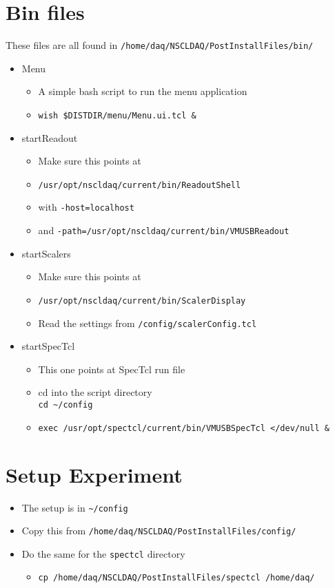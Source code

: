 \documentclass[11pt]{article}
\begin{document}
\section*{Bin files}
\label{sec-8}
These files are all found in \verb~/home/daq/NSCLDAQ/PostInstallFiles/bin/~
\begin{itemize}
\item Menu
\begin{itemize}
\item A simple bash script to run the menu application
\item \verb~wish $DISTDIR/menu/Menu.ui.tcl &~
\end{itemize}
\item startReadout
\begin{itemize}
\item Make sure this points at
\item \verb~/usr/opt/nscldaq/current/bin/ReadoutShell~
\item with \verb~-host=localhost~
\item and \verb~-path=/usr/opt/nscldaq/current/bin/VMUSBReadout~
\end{itemize}
\item startScalers
\begin{itemize}
\item Make sure this points at
\item \verb~/usr/opt/nscldaq/current/bin/ScalerDisplay~
\item Read the settings from \verb~/config/scalerConfig.tcl~
\end{itemize}
\item startSpecTcl
\begin{itemize}
\item This one points at SpecTcl run file
\item cd into the script directory\\
      \verb,cd ~/config,
\item \verb~exec /usr/opt/spectcl/current/bin/VMUSBSpecTcl </dev/null &~
\end{itemize}
\end{itemize}

\section*{Setup Experiment}
\label{sec-9}
\begin{itemize}
\item The setup is in \verb,~/config,
\item Copy this from  \verb~/home/daq/NSCLDAQ/PostInstallFiles/config/~
\item Do the same for the \verb~spectcl~ directory
\begin{itemize}
\item \verb~cp /home/daq/NSCLDAQ/PostInstallFiles/spectcl /home/daq/~
\end{itemize}
\end{itemize}
\end{document}
